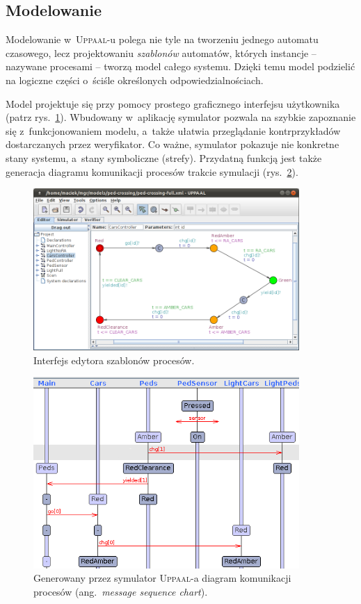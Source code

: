 \documentclass{pracamgr}
\newcommand{\ang}[1]{(ang.~\emph{#1})}
\newcommand{\upp}{\textsc{Uppaal}}
\theoremstyle{plain}
\begin{document}
\subsection{Modelowanie}
Modelowanie w~\upp-u polega nie tyle na tworzeniu jednego automatu
czasowego, lecz projektowaniu \emph{szablonów} automatów, których
instancje -- nazywane procesami -- tworzą model całego systemu. Dzięki
temu model podzielić na logiczne części o~ściśle określonych
odpowiedzialnościach.

Model projektuje się przy pomocy prostego graficznego interfejsu
użytkownika (patrz rys.~\ref{img:uppaal-gui}). Wbudowany w~aplikację
symulator pozwala na szybkie zapoznanie się z~funkcjonowaniem modelu,
a~także ułatwia przeglądanie kontrprzykładów dostarczanych przez
weryfikator. Co ważne, symulator pokazuje nie konkretne stany systemu,
a~stany symboliczne (strefy). Przydatną funkcją jest także generacja
diagramu komunikacji procesów trakcie symulacji
(rys.~\ref{img:uppaal-msc}).
\begin{figure}
  \centering
  \includegraphics[width=0.9\textwidth]{img/uppaal-editor.png}
  \caption{Interfejs edytora szablonów procesów.}
  \label{img:uppaal-gui}
\end{figure}

\begin{figure}
  \centering
  \includegraphics[width=0.9\textwidth]{img/uppaal-msc.png}
  \caption{Generowany przez symulator \upp-a diagram komunikacji
    procesów \ang{message sequence chart}.}
  \label{img:uppaal-msc}
\end{figure}
\end{document}
